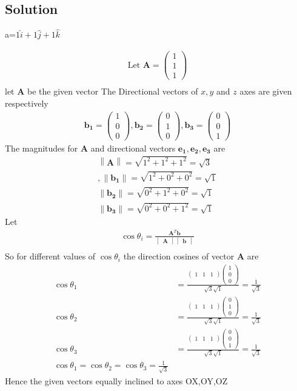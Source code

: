 \documentclass[12pt]{article}
\newcommand{\mydet}[1]{\ensuremath{\begin{vmatrix}#1\end{vmatrix}}}
\providecommand{\norm}[1]{\left\lVert#1\right\rVert}
\newcommand{\myvec}[1]{\ensuremath{\begin{pmatrix}#1\end{pmatrix}}}
\let\vec\mathbf
\begin{document}
\begin{enumerate}
\section{Solution}
\begin{center}
a=$1\hat{i}+1\hat{j}+1\hat{k}$\\
\end{center}
\begin{align}
\text{Let } \vec{A} = \myvec{1\\1\\1}\\  
\end{align}
let $\vec{A}$ be the given vector
The Directional vectors of $x,y$ and $z$ axes are given respectively 
\begin{align}
		\vec{b_1} =\myvec{1\\0\\0},\vec{b_2}=\myvec{0\\1\\0},\vec{b_3} =\myvec{0\\0\\1}
\end{align}
		The magnitudes for $\vec{A}$ and directional vectors $\vec{e_1},\vec{e_2},\vec{e_3}$ are
	\begin{align}
\norm{\vec{A}} =\sqrt{1^2+1^2+1^2}=\sqrt{3}\\,\norm{\vec{b_1}}=\sqrt{1^2+0^2+0^2}=\sqrt{1}\\ \norm{\vec{b_2}}=\sqrt{0^2+1^2+0^2}=\sqrt{1}\\
\norm{\vec{b_3}}=\sqrt{0^2+0^2+1^2}=\sqrt{1}
	\end{align}
Let 
\begin{align}
	\cos\theta_i=\frac{\vec{A}^{T}\vec{b}}{\mydet{\vec{A}}\mydet{\vec{b}}}\\  
\end{align}
		So for different values of $\cos\theta_i$ the direction cosines of vector $\vec{A}$ are
\begin{align}
	\cos\theta_1 &=\frac{\myvec{1&1&1}\myvec{1\\0\\0}}{\sqrt{3}\sqrt{1}}=\frac{1}{\sqrt{3}}\\
	\cos\theta_2 &=\frac{\myvec{1&1&1}\myvec{0\\1\\0}}{\sqrt{3}\sqrt{1}}=\frac{1}{\sqrt{3}}\\
	\cos\theta_3 &=\frac{\myvec{1&1&1}\myvec{0\\0\\1}}{\sqrt{3}\sqrt{1}}=\frac{1}{\sqrt{3}}\\
	\cos\theta_1=\cos\theta_2=\cos\theta_3=\frac{1}{\sqrt{3}}
\end{align}
Hence the given vectors equally inclined to axes OX,OY,OZ
\end{enumerate}
\end{document}
